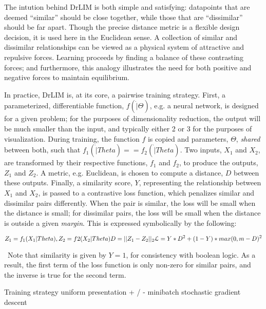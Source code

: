 The intution behind DrLIM is both simple and satisfying: datapoints that are deemed ``similar'' should be close together, while those that are ``dissimilar'' should be far apart.
Though the precise distance metric is a flexible design decision, it is used here in the Euclidean sense.
A collection of similar and dissimilar relationships can be viewed as a physical system of attractive and repulsive forces.
Learning proceeds by finding a balance of these contrasting forces; and furthermore, this analogy illustrates the need for both positive and negative forces to maintain equilibrium.

In practice, DrLIM is, at its core, a pairwise training strategy.
First, a parameterized, differentiable function, $f(\dot | \Theta)$, e.g. a neural network, is designed for a given problem; for the purposes of dimensionality reduction, the output will be much smaller than the input, and typically either 2 or 3 for the purposes of visualization.
During training, the function $f$ is copied and parameters, $\Theta$, \emph{shared} between both, such that $f_1(\dot | Theta) == f_2(\dot | Theta)$.
Two inputs, $X_1$ and $X_2$, are transformed by their respective functions, $f_1$ and $f_2$, to produce the outputs, $Z_1$ and $Z_2$.
A metric, e.g. Euclidean, is chosen to compute a distance, $D$ between these outputs.
Finally, a similarity score, $Y$, representing the relationship between $X_1$ and $X_2$, is passed to a contrastive loss function, which penalizes similar and dissimilar pairs differently.
When the pair is similar, the loss will be small when the distance is small; for dissimilar pairs, the loss will be small when the distance is outside a given \emph{margin}.
This is expressed symbolically by the following:

\begin{equation}
Z_1 = f_1(X_1 | Theta), Z_2 = f2(X_2 | Theta) \\
D = || Z_1 - Z_2 ||_2 \\
\mathcal{L} = Y * D^2 + (1 - Y) * max(0, m - D)^2 \\
\end{equation}

\noindent~Note that similarity is given by $Y=1$, for consistency with boolean logic.
As a result, the first term of the loss function is only non-zero for similar pairs, and the inverse is true for the second term.


Training strategy
uniform presentation + / -
minibatch stochastic gradient descent


